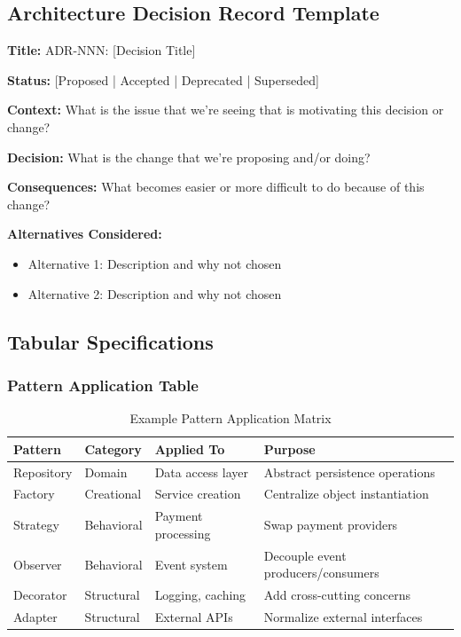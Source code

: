 \documentclass[11pt,letterpaper]{article}
\begin{document}
\subsection{Architecture Decision Record Template}

\begin{definitionbox}
\textbf{Title:} ADR-NNN: [Decision Title]

\textbf{Status:} [Proposed | Accepted | Deprecated | Superseded]

\textbf{Context:} What is the issue that we're seeing that is motivating this decision or change?

\textbf{Decision:} What is the change that we're proposing and/or doing?

\textbf{Consequences:} What becomes easier or more difficult to do because of this change?

\textbf{Alternatives Considered:}
\begin{itemize}[nosep]
    \item Alternative 1: Description and why not chosen
    \item Alternative 2: Description and why not chosen
\end{itemize}
\end{definitionbox}

\subsection{Tabular Specifications}

\subsubsection{Pattern Application Table}

\begin{table}[H]
\centering
\caption{Example Pattern Application Matrix}
\small
\begin{tabular}{@{}L{2.5cm}L{2.5cm}L{3.5cm}L{3.5cm}@{}}
\toprule
\textbf{Pattern} & \textbf{Category} & \textbf{Applied To} & \textbf{Purpose} \\
\midrule
Repository & Domain & Data access layer & Abstract persistence operations \\
\addlinespace
Factory & Creational & Service creation & Centralize object instantiation \\
\addlinespace
Strategy & Behavioral & Payment processing & Swap payment providers \\
\addlinespace
Observer & Behavioral & Event system & Decouple event producers/consumers \\
\addlinespace
Decorator & Structural & Logging, caching & Add cross-cutting concerns \\
\addlinespace
Adapter & Structural & External APIs & Normalize external interfaces \\
\bottomrule
\end{tabular}
\end{table}
\end{document}
